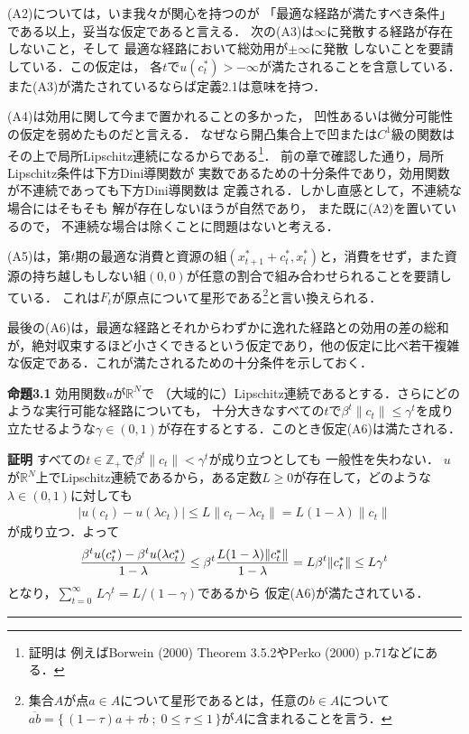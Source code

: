 \documentclass[a4paper,11pt]{jsarticle}
\DeclareRobustCommand{\lfrac}[2]{{\lower.4ex\hbox{\begingroup\ensuremath{#1}\endgroup}\over{\hspace{.2mm}#2\hspace{.2mm}}}}
\begin{document}
(A2)については，いま我々が関心を持つのが
「最適な経路が満たすべき条件」である以上，妥当な仮定であると言える．
次の(A3)は$\infty$に発散する経路が存在しないこと，そして
最適な経路において総効用が$\pm \infty$に発散
しないことを要請している．この仮定は，
各$t$で$u(c_t^*)>-\infty$が満たされることを含意している．
また(A3)が満たされているならば定義2.1は意味を持つ．

(A4)は効用に関して今まで置かれることの多かった，
凹性あるいは微分可能性の仮定を弱めたものだと言える．
なぜなら開凸集合上で凹または$C^1$級の関数は
その上で局所Lipschitz連続になるからである\footnote{証明は
例えばBorwein (2000) Theorem 3.5.2やPerko (2000) p.71などにある．}．
前の章で確認した通り，局所Lipschitz条件は下方Dini導関数が
実数であるための十分条件であり，効用関数が不連続であっても下方Dini導関数は
定義される．しかし直感として，不連続な場合にはそもそも
解が存在しないほうが自然であり，
また既に(A2)を置いているので，
不連続な場合は除くことに問題はないと考える．

(A5)は，第$t$期の最適な消費と資源の組$(x_{t+1}^*+c_t^*,x_t^*)$と，消費をせず，また資源の持ち越しもしない組$(0,0)$が任意の割合で組み合わせられることを要請している．
これは$F_t$が原点について星形である\footnote{集合$A$が点$a \in A$について星形であるとは，任意の$b \in A$について$\overline{ab}=\{\,(1-\tau)a+\tau b \;;\; 0\leq \tau \leq 1\,\}$が$A$に含まれることを言う．}と言い換えられる．

最後の(A6)は，最適な経路とそれからわずかに逸れた経路との効用の差の総和が，絶対収束するほど小さくできるという仮定であり，他の仮定に比べ若干複雑な仮定である．これが満たされるための十分条件を示しておく．

\vspace{7mm}
\noindent \textbf{命題3.1}\hspace*{.7mm} 効用関数$u$が$\mathbb{R}^N$で
（大域的に）Lipschitz連続であるとする．さらにどのような実行可能な経路についても，
十分大きなすべての$t$で$\beta^t \|c_t\|\leq \gamma^t$を成り立たせるような$\gamma \in (0,1)$が存在するとする．このとき仮定(A6)は満たされる．
\bigskip

\noindent \textbf{証明}\hspace{.7mm} すべての$t\in \mathbb{Z}_+$で$\beta^t\|c_t\|<\gamma^t$が成り立つとしても
一般性を失わない．
$u$が$\mathbb{R}^N$上でLipschitz連続であるから，ある定数$L\geq 0$が存在して，どのような$\lambda \in (0,1)$に対しても
\begin{align*}
	|u(c_t)-u(\lambda c_t)|\leq L\|c_t-\lambda c_t\|=L(1-\lambda)\|c_t\|
\end{align*}
が成り立つ．よって
\begin{align*}
	\lfrac{\beta^t u(c_t^*)-\beta^t u (\lambda c_t^*)}{1-\lambda}\leq \beta^t \lfrac{L(1-\lambda)\|c_t^*\|}{1-\lambda}=L\beta^t \|c_t^*\|\leq L\gamma^t
\end{align*}
となり，${\textstyle \sum_{t=0}^\infty}\,L\gamma^t=L/(1-\gamma)$であるから
仮定(A6)が満たされている．\hfill \rule[-2pt]{5pt}{10pt}
\end{document}
